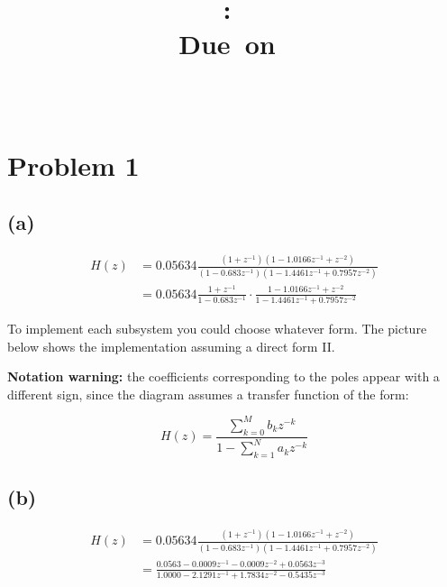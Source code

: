 \documentclass{article}
\title{
\vspace{2in}
\textmd{\textbf{\hmwkClass:\ \hmwkTitle}}\\
\normalsize\vspace{0.1in}\small{Due\ on\ \hmwkDueDate}\\
\vspace{0.1in}\large{\textit{\hmwkClassInstructor\ \hmwkClassTime}}
\vspace{3in}
}
\author{\textbf{\hmwkAuthorName}}
\date{} %
\begin{document}
	
	
\section{Problem 1}

\subsection{(a)}

\begin{align} \nonumber
H(z) &= 0.05634\frac{(1+z^{-1})(1 -1.0166z^{-1} + z^{-2})}{(1-0.683z^{-1})(1 -1.4461z^{-1} + 0.7957z^{-2})} \\
&= 0.05634\frac{1+z^{-1}}{1-0.683z^{-1}}\cdot\frac{1 -1.0166z^{-1} + z^{-2}}{1 -1.4461z^{-1} + 0.7957z^{-2}}
\end{align}

To implement each subsystem you could choose whatever form. The picture below shows the implementation assuming a direct form II.

\begin{figure}[!h]
	\resizebox{0.9\textwidth}{!}{}
\end{figure}
\noindent\textbf{Notation warning:} the coefficients corresponding to the poles appear with a different sign, since the diagram assumes a transfer function of the form:

\begin{equation}
	H(z) = \frac{\sum_{k=0}^M b_kz^{-k}}{1-\sum_{k=1}^N a_kz^{-k}}
\end{equation}

\subsection{(b)}

\begin{align} \nonumber
H(z) &= 0.05634\frac{(1+z^{-1})(1 -1.0166z^{-1} + z^{-2})}{(1-0.683z^{-1})(1 -1.4461z^{-1} + 0.7957z^{-2})} \\
&= \frac{0.0563 -0.0009z^{-1}   -0.0009z^{-2}   + 0.0563z^{-3}}{1.0000   -2.1291z^{-1}    +1.7834z^{-2}   -0.5435z^{-3}}
\end{align}

\FloatBarrier
\begin{figure}[!h]
	\centering
	\resizebox{0.6\textwidth}{!}{}
\end{figure}
\FloatBarrier
\end{document}
